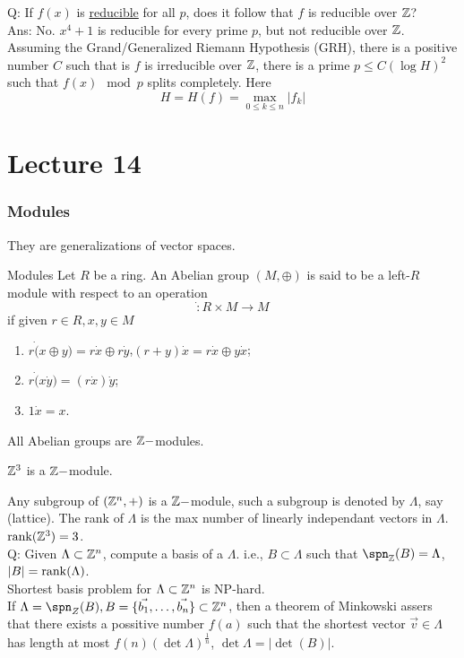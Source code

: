 \documentclass[twoside, openright, fontsize=10pt, headings=big]{scrbook}
\newcommand{\addunumberedsubsec}[1]{%
    \subsection*{#1}%
    \addcontentsline{toc}{subsection}{#1}%
}
\begin{document}
Q: If $f(x)$ is \underline{reducible} for all $p$, does it follow that $f$ is reducible over $\mathbb{Z}$?\\
Ans: No. $x^4+1$ is reducible for every prime $p$, but not reducible over $\mathbb{Z}$.\\
Assuming the Grand/Generalized Riemann Hypothesis (GRH), there is a positive number $C$ such that is $f$ is irreducible over $\mathbb{Z}$, there is a prime $p\leq C(\log H)^2$ such that $f(x)\mod p$ splits completely. Here 
\[
    H=H(f)=\max_{0\leq k\leq n}|f_k|
\]

\chapter{Lecture 14}
\addunumberedsubsec{Modules}
They are generalizations of vector spaces.
\begin{definition}{Modules}{}
    Let $R$ be a ring. An Abelian group $(M,\oplus)$ is said to be a left-$R$ module with respect to an operation
    \[
        \dot:R\times M\to M
    \]
    if given $r\in R, x,y\in M$
    \begin{enumerate}
        \item $r\dot(x\oplus y)=r\dot x\oplus r\dot y$,$(r+ y)\dot x=r\dot x\oplus y\dot x$;
        \item $r\dot(x\dot y)=(r\dot x)\dot y$;
        \item $1\dot x=x$.
    \end{enumerate}
\end{definition}
All Abelian groups are $\mathbb{Z}-$modules.
\begin{example}{}{}
    $\mathbb{Z}^3$ is a $\mathbb{Z}-$module.\\
\end{example}
Any subgroup of $(\mathbb{Z}^n,+)$ is a $\mathbb{Z}-$module, such a subgroup is denoted by $\Lambda$, say (lattice). The rank of $\Lambda$ is the max number of linearly independant vectors in $\Lambda$.\\
$\operatorname{rank}(\mathbb{Z}^3)=3$.\\
Q: Given $\Lambda\subset\mathbb{Z}^n$, compute a basis of a $\Lambda$. i.e., $B\subset\Lambda$ such that $\spn_{\Z}(B)=\Lambda$, $|B|=\operatorname{rank}(\Lambda)$.\\
Shortest basis problem for $\Lambda\subset\mathbb{Z}^n$ is NP-hard.\\
If $\Lambda=\spn_Z(B),B=\{\vec{b_1},\dots,\vec{b_n}\}\subset\Z^n$, then a theorem of Minkowski assers that there exists a possitive number $f(a)$ such that the shortest vector $\vec{v}\in\Lambda$ has length at most $f(n)(\det\Lambda)^{\frac{1}{n}}$, $\det\Lambda=|\det(B)|$.
\end{document}
